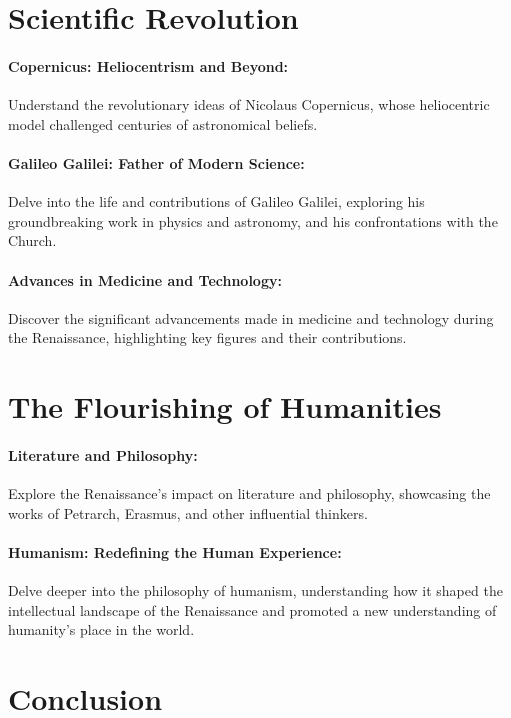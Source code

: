 \documentclass[a4paper,12pt]{book}
\begin{document}
\section*{Scientific Revolution}

\paragraph{Copernicus: Heliocentrism and Beyond:}
Understand the revolutionary ideas of Nicolaus Copernicus, whose heliocentric model challenged centuries of astronomical beliefs.

\paragraph{Galileo Galilei: Father of Modern Science:}
Delve into the life and contributions of Galileo Galilei, exploring his groundbreaking work in physics and astronomy, and his confrontations with the Church.

\paragraph{Advances in Medicine and Technology:}
Discover the significant advancements made in medicine and technology during the Renaissance, highlighting key figures and their contributions.

\section*{The Flourishing of Humanities}

\paragraph{Literature and Philosophy:}
Explore the Renaissance’s impact on literature and philosophy, showcasing the works of Petrarch, Erasmus, and other influential thinkers.

\paragraph{Humanism: Redefining the Human Experience:}
Delve deeper into the philosophy of humanism, understanding how it shaped the intellectual landscape of the Renaissance and promoted a new understanding of humanity’s place in the world.

\section*{Conclusion}
\end{document}
